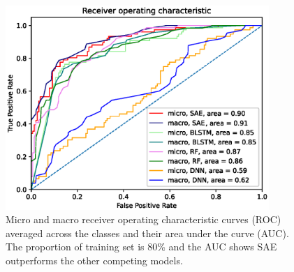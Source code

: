 \begin{figure}
    \centering
    \includegraphics[width=0.89\textwidth]{images/roc_curve-p8.eps}
    \caption{Micro and macro receiver operating characteristic curves (ROC) averaged across the classes and their area under the curve (AUC). The proportion of training set is 80\% and the AUC shows SAE outperforms the other competing models.} \label{fig: roc_curve}
\end{figure}